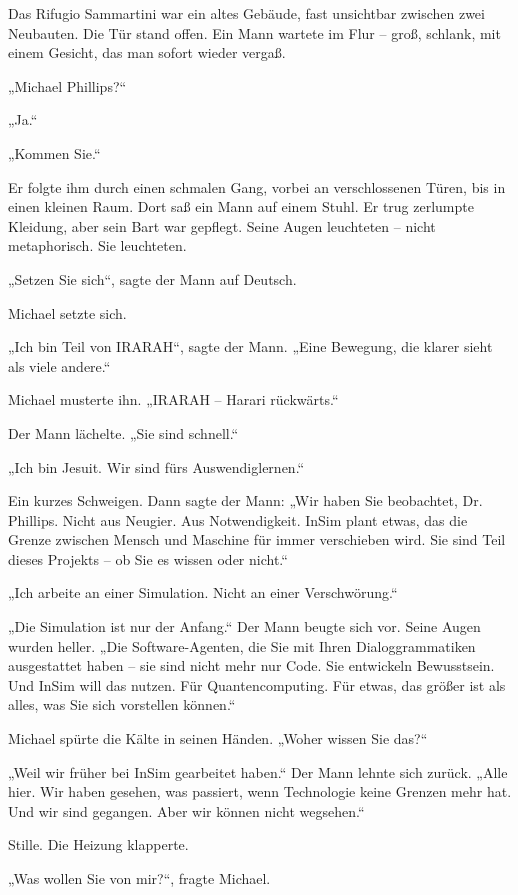 \documentclass[
]{article}
\begin{document}
Das Rifugio Sammartini war ein altes Gebäude, fast unsichtbar zwischen zwei Neubauten. Die Tür stand offen. Ein Mann wartete im Flur -- groß, schlank, mit einem Gesicht, das man sofort wieder vergaß.

„Michael Phillips?{\kern0pt}``

„Ja.``

„Kommen Sie.``

Er folgte ihm durch einen schmalen Gang, vorbei an verschlossenen Türen, bis in einen kleinen Raum. Dort saß ein Mann auf einem Stuhl. Er trug zerlumpte Kleidung, aber sein Bart war gepflegt. Seine Augen leuchteten -- nicht metaphorisch. Sie leuchteten.

„Setzen Sie sich``, sagte der Mann auf Deutsch.

Michael setzte sich.

„Ich bin Teil von IRARAH``, sagte der Mann. „Eine Bewegung, die klarer sieht als viele andere.``

Michael musterte ihn. „IRARAH -- Harari rückwärts.``

Der Mann lächelte. „Sie sind schnell.``

„Ich bin Jesuit. Wir sind fürs Auswendiglernen.``

Ein kurzes Schweigen. Dann sagte der Mann: „Wir haben Sie beobachtet, Dr. Phillips. Nicht aus Neugier. Aus Notwendigkeit. InSim plant etwas, das die Grenze zwischen Mensch und Maschine für immer verschieben wird. Sie sind Teil dieses Projekts -- ob Sie es wissen oder nicht.``

„Ich arbeite an einer Simulation. Nicht an einer Verschwörung.``

„Die Simulation ist nur der Anfang.`` Der Mann beugte sich vor. Seine Augen wurden heller. „Die Software-Agenten, die Sie mit Ihren Dialoggrammatiken ausgestattet haben -- sie sind nicht mehr nur Code. Sie entwickeln Bewusstsein. Und InSim will das nutzen. Für Quantencomputing. Für etwas, das größer ist als alles, was Sie sich vorstellen können.``

Michael spürte die Kälte in seinen Händen. „Woher wissen Sie das?{\kern0pt}``

„Weil wir früher bei InSim gearbeitet haben.`` Der Mann lehnte sich zurück. „Alle hier. Wir haben gesehen, was passiert, wenn Technologie keine Grenzen mehr hat. Und wir sind gegangen. Aber wir können nicht wegsehen.``

Stille. Die Heizung klapperte.

„Was wollen Sie von mir?{\kern0pt}``, fragte Michael.
\end{document}
